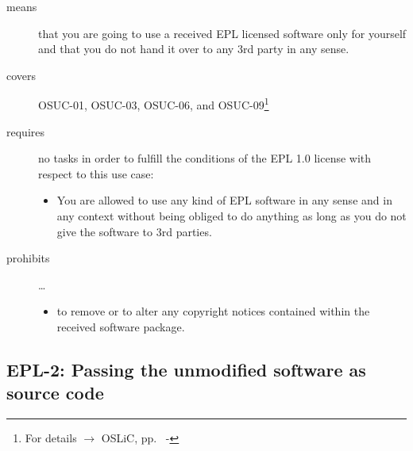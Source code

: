 \begin{description}

\item[means] that you are going to use a received EPL licensed software only
for yourself and that you do not hand it over to any 3rd party in any sense.

\item[covers] OSUC-01, OSUC-03, OSUC-06, and OSUC-09\footnote{For details 
$\rightarrow$ OSLiC, pp.\ \pageref{OSUC-01-DEF} - \pageref{OSUC-09-DEF}}

\item[requires] no tasks in order to fulfill the conditions of the EPL 1.0
license with respect to this use case:
  \begin{itemize}
    \item You are allowed to use any kind of EPL software in any sense and in
    any context without being obliged to do anything as long as you do not
    give the software to 3rd parties.
  \end{itemize}

\item[prohibits] \ldots
\begin{itemize}
  \item to remove or to alter any copyright notices contained within the
  received software package.
\end{itemize}

\end{description}

\subsection{EPL-2: Passing the unmodified software as source code}
\label{OSUC-02-EPL} \label{OSUC-05-EPL} \label{OSUC-07-EPL} 

